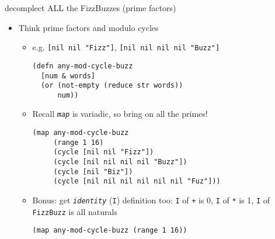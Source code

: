 \documentclass[presentation]{beamer}
\begin{document}
\begin{frame}[label={sec:orge3d262c},fragile]{decomplect ALL the FizzBuzzes (prime factors)}
 \begin{itemize}
\item Think prime factors and modulo cycles
\begin{itemize}
\item e.g. \texttt{[nil nil "Fizz"]}, \texttt{[nil nil nil nil "Buzz"]}
\begin{verbatim}
(defn any-mod-cycle-buzz
  [num & words]
  (or (not-empty (reduce str words))
      num))
\end{verbatim}
\item Recall \emph{\texttt{map}} is variadic, so bring on all the primes!
\begin{verbatim}
(map any-mod-cycle-buzz
     (range 1 16)
     (cycle [nil nil "Fizz"])
     (cycle [nil nil nil nil "Buzz"])
     (cycle [nil "Biz"])
     (cycle [nil nil nil nil nil nil "Fuz"]))
\end{verbatim}
\item Bonus: get \emph{\texttt{identity}} (\texttt{I}) definition too:
\texttt{I} of \texttt{+} is 0, \texttt{I} of \texttt{*} is 1, \texttt{I} of \texttt{FizzBuzz} is all naturals
\begin{verbatim}
(map any-mod-cycle-buzz (range 1 16))
\end{verbatim}
\end{itemize}
\end{itemize}
\end{frame}
\end{document}
